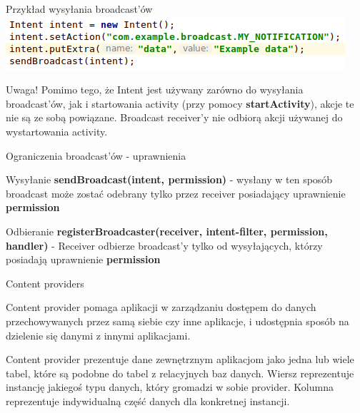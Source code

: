 \documentclass{beamer}
\begin{document}
\begin{frame}{Przykład wysyłania broadcast'ów}
	\centering
	\includegraphics[width=\textwidth]{send-broadcast}
	\begin{block}{Uwaga!}
		Pomimo tego, że Intent jest używany zarówno do wysyłania broadcast'ów, jak i startowania activity (przy pomocy \textbf{startActivity}), akcje te nie są ze sobą powiązane. Broadcast receiver'y nie odbiorą akcji używanej do wystartowania activity.
	\end{block}
\end{frame}

\begin{frame}{Ograniczenia broadcast'ów - uprawnienia}
	\begin{block}{Wysyłanie}
		\textbf{sendBroadcast(intent, permission)} - wysłany w ten sposób broadcast może zostać odebrany tylko przez receiver posiadający uprawnienie \textbf{permission} 
	\end{block}
	\begin{block}{Odbieranie}
		\textbf{registerBroadcaster(receiver, intent-filter, permission, handler)} - Receiver odbierze broadcast'y tylko od wysyłających, którzy posiadają uprawnienie \textbf{permission}
	\end{block}
\end{frame}


\begin{frame}{Content providers}
	\begin{block}{}
		Content provider pomaga aplikacji w zarządzaniu dostępem do danych przechowywanych przez samą siebie czy inne aplikacje, i udostępnia sposób na dzielenie się danymi z innymi aplikacjami. 
	\end{block}
	\begin{block}{}
		Content provider prezentuje dane zewnętrznym aplikacjom jako jedna lub wiele tabel, które są podobne do tabel z relacyjnych baz danych. Wiersz reprezentuje instancję jakiegoś typu danych, który gromadzi w sobie provider. Kolumna reprezentuje indywidualną część danych dla konkretnej instancji.
	\end{block}
\end{frame}
\end{document}
